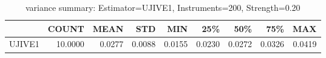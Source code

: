 \begin{table}[ht]
\centering
\caption{variance summary: Estimator=UJIVE1, Instruments=200, Strength=0.20}
\begin{tabular}{lrrrrrrrr}
\toprule
 & COUNT & MEAN & STD & MIN & 25\% & 50\% & 75\% & MAX \\
\midrule
UJIVE1 & 10.0000 & 0.0277 & 0.0088 & 0.0155 & 0.0230 & 0.0272 & 0.0326 & 0.0419 \\
\bottomrule
\end{tabular}
\end{table}
